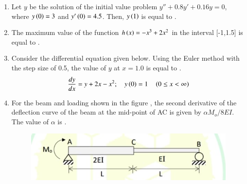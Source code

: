 \documentclass[journal,12pt,onecolumn]{article}
\theoremstyle{remark}
\begin{document}
\begin{enumerate}
\begin{enumerate}
\end{enumerate}

\item Let $y$ be the solution of the initial value problem $y'' + 0.8y' + 0.16y = 0$, where $y\left(0\right) = 3$ and $y'\left(0\right) = 4.5$. Then, $y\left(1\right)$ is equal to \underline{\hspace{2cm}} .

\hfill{}

\item The maximum value of the function $h\left(x\right) = -x^3 + 2x^2$ in the interval [-1,1.5] is equal to \underline{\hspace{2cm}} .

\hfill{}

\item Consider the differential equation given below. Using the Euler method with the step size  of 0.5, the value of $y$ at $x=1.0$ is equal to \underline{\hspace{2cm}} .
\begin{align} \frac{dy}{dx} = y + 2x - x^2; \quad y\left(0\right) = 1 \quad \left(0 \le x < \infty\right) \end{align}

\hfill{}

\item For the beam and loading shown in the figure  , the second derivative of the deflection curve of the beam at the mid-point of AC is given by $\alpha M_o / 8EI$. The value of $\alpha$ is \underline{\hspace{2cm}} .
\begin{figure}[H]
    \centering
    \includegraphics[width=0.7\columnwidth]{figs/1q-50.jpg}
    \caption{}
    \label{fig:q50}
\end{figure}

\hfill{}


\end{enumerate}
\end{document}
